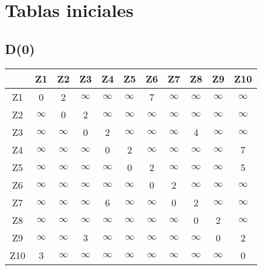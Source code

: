 \documentclass[a4paper,11pt]{article}
\begin{document}
\section*{Tablas iniciales}
\subsection*{D(0)}
\begin{center}
\begin{tabular}{c|cccccccccc}
 & Z1 & Z2 & Z3 & Z4 & Z5 & Z6 & Z7 & Z8 & Z9 & Z10 \\ \hline
Z1 & 0 & 2 & $\infty$ & $\infty$ & $\infty$ & 7 & $\infty$ & $\infty$ & $\infty$ & $\infty$ \\
Z2 & $\infty$ & 0 & 2 & $\infty$ & $\infty$ & $\infty$ & $\infty$ & $\infty$ & $\infty$ & $\infty$ \\
Z3 & $\infty$ & $\infty$ & 0 & 2 & $\infty$ & $\infty$ & $\infty$ & 4 & $\infty$ & $\infty$ \\
Z4 & $\infty$ & $\infty$ & $\infty$ & 0 & 2 & $\infty$ & $\infty$ & $\infty$ & $\infty$ & 7 \\
Z5 & $\infty$ & $\infty$ & $\infty$ & $\infty$ & 0 & 2 & $\infty$ & $\infty$ & $\infty$ & 5 \\
Z6 & $\infty$ & $\infty$ & $\infty$ & $\infty$ & $\infty$ & 0 & 2 & $\infty$ & $\infty$ & $\infty$ \\
Z7 & $\infty$ & $\infty$ & $\infty$ & 6 & $\infty$ & $\infty$ & 0 & 2 & $\infty$ & $\infty$ \\
Z8 & $\infty$ & $\infty$ & $\infty$ & $\infty$ & $\infty$ & $\infty$ & $\infty$ & 0 & 2 & $\infty$ \\
Z9 & $\infty$ & $\infty$ & 3 & $\infty$ & $\infty$ & $\infty$ & $\infty$ & $\infty$ & 0 & 2 \\
Z10 & 3 & $\infty$ & $\infty$ & $\infty$ & $\infty$ & $\infty$ & $\infty$ & $\infty$ & $\infty$ & 0 \\
\end{tabular}
\end{center}
\end{document}
